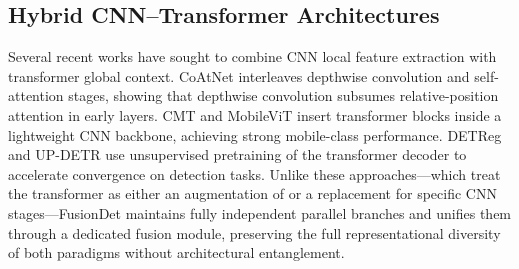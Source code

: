 \subsection{Hybrid CNN--Transformer Architectures}

Several recent works have sought to combine CNN local feature
extraction with transformer global context. CoAtNet interleaves
depthwise convolution and self-attention stages, showing that
depthwise convolution subsumes relative-position attention in early
layers. CMT and MobileViT insert transformer blocks inside a
lightweight CNN backbone, achieving strong mobile-class performance.
DETReg and UP-DETR use unsupervised pretraining of the transformer
decoder to accelerate convergence on detection tasks. Unlike these
approaches---which treat the transformer as either an augmentation of
or a replacement for specific CNN stages---FusionDet maintains fully
independent parallel branches and unifies them through a dedicated
fusion module, preserving the full representational diversity of both
paradigms without architectural entanglement.
